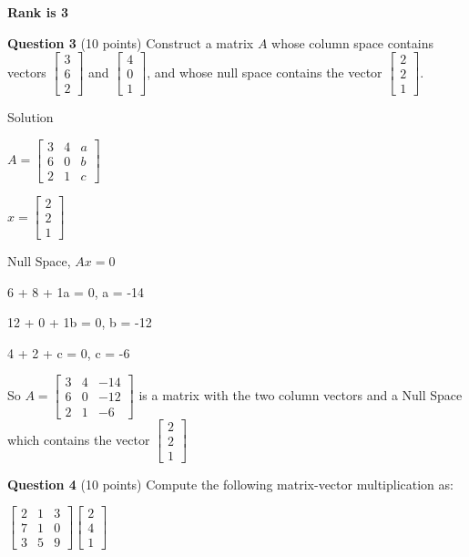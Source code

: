 \documentclass{article}
\begin{document}
\textbf{Rank is 3}

\vspace{2em}
\noindent
\textbf{Question 3} (10 points) Construct a matrix $A$ whose column space contains vectors $\begin{bmatrix}
    3 \\ 6 \\ 2
\end{bmatrix}$ and $\begin{bmatrix}4 \\ 0 \\ 1\end{bmatrix}$, and whose null space contains the vector $\begin{bmatrix}
    2 \\ 2 \\ 1
\end{bmatrix}$.

Solution

$A = \begin{bmatrix}
    3 & 4 & a \\
    6 & 0 & b \\
    2 & 1 & c
\end{bmatrix}$

$x = \begin{bmatrix}
    2 \\ 2 \\ 1
\end{bmatrix}$

Null Space, $Ax=0$

6 + 8 + 1a = 0, a = -14

12 + 0 + 1b = 0, b = -12

4 + 2 + c = 0, c = -6

So $A = \begin{bmatrix}
    3 & 4 & -14 \\
    6 & 0 & -12 \\
    2 & 1 & -6
\end{bmatrix}$ is a matrix with the two column vectors and a Null Space which contains the vector $\begin{bmatrix}
    2 \\ 2 \\ 1
\end{bmatrix}$

\vspace{2em}
\noindent
\textbf{Question 4} (10 points) Compute the following matrix-vector multiplication as:

$\begin{bmatrix}
    2 & 1 & 3 \\
    7 & 1 & 0 \\
    3 & 5 & 9
\end{bmatrix}\begin{bmatrix}
    2 \\ 4 \\ 1
\end{bmatrix}$
\end{document}
